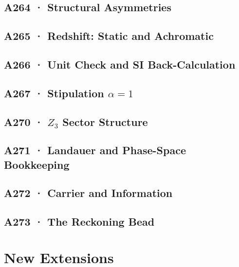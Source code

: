 \documentclass[11pt,twoside,openright]{book}
\begin{document}
\chapter[A264 · Structural Asymmetries]{A264 · Structural Asymmetries}


\chapter[A265 · Redshift]{A265 · Redshift: Static and Achromatic}


\chapter[A266 · Unit Check]{A266 · Unit Check and SI Back-Calculation}


\chapter[A267 · Stipulation $\alpha=1$]{A267 · Stipulation $\alpha=1$}


\chapter[A270 · $Z_3$ Sector Structure]{A270 · $Z_3$ Sector Structure}


\chapter[A271 · Landauer and Phase Space]{A271 · Landauer and Phase-Space Bookkeeping}


\chapter[A272 · Carrier and Information]{A272 · Carrier and Information}


\chapter[A273 · The Reckoning Bead]{A273 · The Reckoning Bead}


\part{New Extensions}
\end{document}
